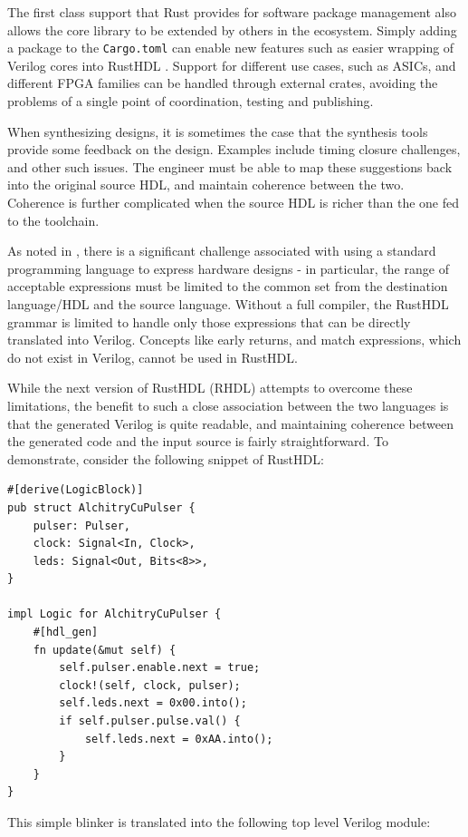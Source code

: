 \documentclass[conference]{IEEEtran}
\begin{document}
The first class support that Rust provides for software package management also allows the core library to be extended
by others in the ecosystem.  Simply adding a package to the \verb|Cargo.toml| can enable new features such as 
easier wrapping of Verilog cores into RustHDL \cite{b8}.  Support for different use cases, such as ASICs, and different
FPGA families can be handled through external crates, avoiding the problems of a single point of coordination, testing
and publishing.

When synthesizing designs, it is sometimes the case that the synthesis tools provide some feedback on the design.
Examples include timing closure challenges, and other such issues.  The engineer must be able to map these 
suggestions back into the original source HDL, and maintain coherence between the two.  Coherence is further
complicated when the source HDL is richer than the one fed to the toolchain.  

As noted in \cite{b1}, there is a significant challenge associated with using 
a standard programming language to express hardware designs - in particular, the range of acceptable expressions
must be limited to the common set from the destination language/HDL and the source language.  Without a full compiler,
the RustHDL grammar is limited to handle only those expressions that can be directly translated into Verilog.  
Concepts like early returns, and match expressions, which do not exist in Verilog, cannot be used in RustHDL.  

While the next version of RustHDL (RHDL) attempts to overcome these limitations, the benefit to such a close 
association between the two languages is that the generated Verilog is quite readable, and maintaining
coherence between the generated code and the input source is fairly straightforward.   
To demonstrate, consider the following snippet of RustHDL:

\begin{verbatim}
#[derive(LogicBlock)]
pub struct AlchitryCuPulser {
    pulser: Pulser,
    clock: Signal<In, Clock>,
    leds: Signal<Out, Bits<8>>,
}

impl Logic for AlchitryCuPulser {
    #[hdl_gen]
    fn update(&mut self) {
        self.pulser.enable.next = true;
        clock!(self, clock, pulser);
        self.leds.next = 0x00.into();
        if self.pulser.pulse.val() {
            self.leds.next = 0xAA.into();
        }
    }
}
\end{verbatim}

This simple blinker is translated into the following top level Verilog module:
\end{document}
